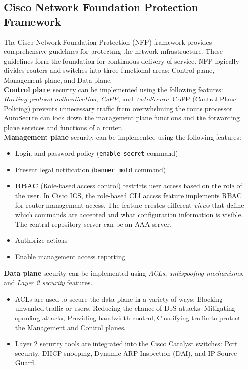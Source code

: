 \subsection{Cisco Network Foundation Protection Framework}

The Cisco Network Foundation Protection (NFP) framework provides comprehensive guidelines for protecting the network infrastructure. These guidelines form the foundation for continuous delivery of service. NFP logically divides routers and switches into three functional areas: Control plane, Management plane, and Data plane.\\

\textbf{Control plane} security can be implemented using the following features: \emph{Routing protocol authentication}, \emph{CoPP}, and \emph{AutoSecure}. CoPP (Control Plane Policing) prevents unnecessary traffic from overwhelming the route processor. AutoSecure can lock down the management plane functions and the forwarding plane services and functions of a router.\\

\textbf{Management plane} security can be implemented using the following features:

\begin{itemize}
\item Login and password policy (\verb|enable secret| command)
\item Present legal notification (\verb|banner motd| command)
\item \textbf{RBAC} (Role-based access control)  restricts user access based on the role of the user. In Cisco IOS, the role-based CLI access feature implements RBAC for router management access. The feature creates different \emph{views} that define which commands are accepted and what configuration information is visible. The central repository server can be an AAA server.
\item Authorize actions
\item Enable management access reporting
\end{itemize}

\textbf{Data plane} security can be implemented using \emph{ACLs}, \emph{antispoofing mechanisms}, and \emph{Layer 2 security} features. 

\begin{itemize}
\item ACLs are used to secure the data plane in a variety of ways: Blocking unwanted traffic or users, Reducing the chance of DoS attacks, Mitigating spoofing attacks, Providing bandwidth control, Classifying traffic to protect the Management and Control planes.
\item Layer 2 security tools are integrated into the Cisco Catalyst switches: Port security, DHCP snooping, Dynamic ARP Inspection (DAI), and IP Source Guard.
\end{itemize}